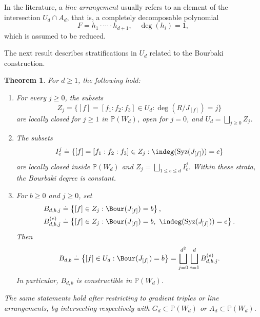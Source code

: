 \documentclass[11pt]{amsart} %
\newtheorem{Theorem}{Theorem}[section]
\theoremstyle{definition}
\def\syz{\mbox{\rm Syz}}
\def\NZQ{\mathbb}               %
\def\PP{{\NZQ P}}
\begin{document}
In the literature, a \emph{line arrangement} usually refers to an element of the intersection $U_d \cap A_d$, that is, a completely decomposable polynomial
$$
F = h_1 \cdot \cdots \cdot h_{d+1}, \quad \deg(h_i) = 1,
$$
which is assumed to be reduced. 

The next result describes stratifications in $U_d$ related to the Bourbaki construction.

\begin{Theorem}\label{thm:strata}
For $d \geq 1$, the following hold:

\begin{enumerate}
\item[(i)] For every $j\geq 0$, the subsets 
$$
Z_j = \{[f] = [f_1:f_2:f_3] \in U_d : \deg(R/J_{[f]}) = j\}
$$
are locally closed for $j \geq 1$ in $\mathbb{P}(W_d)$, open for $j = 0$, and $U_d = \bigsqcup_{j \geq 0} Z_j$.

\item[(ii)] The subsets
$$
I_e^j \doteq \{[f] = [f_1 : f_2 : f_3] \in Z_j : \indeg(\syz(J_{[f]})) = e\}
$$
are locally closed inside $\mathbb{P}(W_d)$ and $Z_j = \bigsqcup_{1 \leq e \leq d} I_e^j$. Within these strata, the Bourbaki degree is constant. 

\item[(iii)] For $b\geq0$ and $j\geq0$, set
\begin{align*}
B_{d,b,j}
&\doteq
\left\{
[f]\in Z_j:
\Bour(J_{[f]})=b
\right\},\\
B_{d,b,j}^{(e)}
&\doteq
\left\{
[f]\in Z_j:
\Bour(J_{[f]})=b,\ 
\indeg(\syz(J_{[f]}))=e
\right\}.
\end{align*}
Then
\[
B_{d,b}
\doteq
\left\{
[f]\in U_d:\Bour(J_{[f]})=b
\right\}
=
\bigsqcup_{j=0}^{d^2}
\bigsqcup_{e=1}^{d}
B_{d,b,j}^{(e)}.
\]
In particular, $B_{d,b}$ is constructible in $\PP(W_d)$.
\end{enumerate}

The same statements hold after restricting to gradient triples or
line arrangements, by intersecting respectively with
$G_d\subset\PP(W_d)$ or $A_d\subset\PP(W_d)$.
\end{Theorem}
\end{document}
